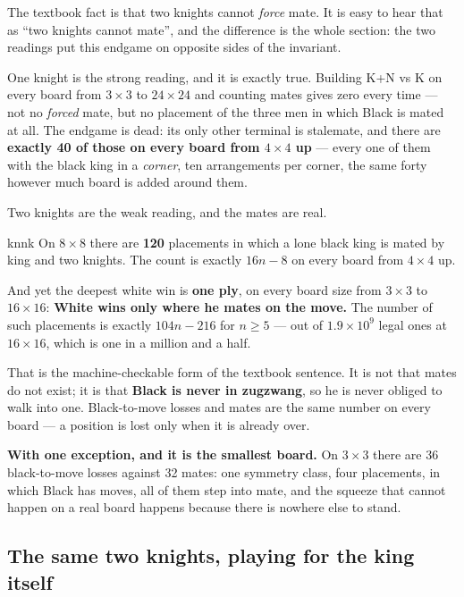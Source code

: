 \documentclass[11pt]{article}
\begin{document}
The textbook fact is that two knights cannot \emph{force} mate. It is easy to
hear that as ``two knights cannot mate'', and the difference is the whole
section: the two readings put this endgame on opposite sides of the invariant.

One knight is the strong reading, and it is exactly true. Building K+N vs K on
every board from $3\times3$ to $24\times24$ and counting mates gives zero every
time --- not no \emph{forced} mate, but no placement of the three men in which
Black is mated at all. The endgame is dead: its only other terminal is
stalemate, and there are \textbf{exactly 40 of those on every board from
$4\times4$ up} --- every one of them with the black king in a \emph{corner},
ten arrangements per corner, the same forty however much board is added around
them.

Two knights are the weak reading, and the mates are real.

\begin{result}[title={K + N + N vs K: mates exist; zugzwang does not}]{knnk}
On $8\times8$ there are \textbf{120} placements in which a lone black king is
mated by king and two knights. The count is exactly $16n-8$ on every board from
$4\times4$ up.

\smallskip
And yet the deepest white win is \textbf{one ply}, on every board size from
$3\times3$ to $16\times16$: \textbf{White wins only where he mates on the
move.} The number of such placements is exactly $104n-216$ for $n \ge 5$ ---
out of $1.9\times10^9$ legal ones at $16\times16$, which is one in a million
and a half.

\smallskip
That is the machine-checkable form of the textbook sentence. It is not that
mates do not exist; it is that \textbf{Black is never in zugzwang}, so he is
never obliged to walk into one. Black-to-move losses and mates are the same
number on every board --- a position is lost only when it is already over.

\smallskip
\textbf{With one exception, and it is the smallest board.} On $3\times3$ there
are 36 black-to-move losses against 32 mates: one symmetry class, four
placements, in which Black has moves, all of them step into mate, and the
squeeze that cannot happen on a real board happens because there is nowhere
else to stand.
\end{result}

\subsection{The same two knights, playing for the king itself}\label{sub:kn-capture}
\end{document}
